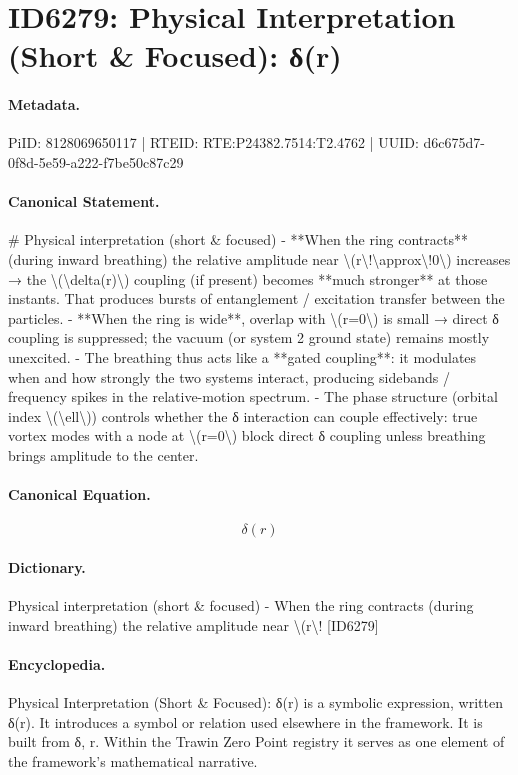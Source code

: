 \section*{ID6279: Physical Interpretation (Short \& Focused): δ(r)}
\paragraph{Metadata.}
PiID: 8128069650117 | RTEID: RTE:P24382.7514:T2.4762 | UUID: d6c675d7-0f8d-5e59-a222-f7be50c87c29

\paragraph{Canonical Statement.}
\# Physical interpretation (short \& focused) - **When the ring contracts** (during inward breathing) the relative amplitude near \textbackslash{}(r\textbackslash{}!\textbackslash{}approx\textbackslash{}!0\textbackslash{}) increases → the \textbackslash{}(\textbackslash{}delta(r)\textbackslash{}) coupling (if present) becomes **much stronger** at those instants. That produces bursts of entanglement / excitation transfer between the particles. - **When the ring is wide**, overlap with \textbackslash{}(r=0\textbackslash{}) is small → direct δ coupling is suppressed; the vacuum (or system 2 ground state) remains mostly unexcited. - The breathing thus acts like a **gated coupling**: it modulates when and how strongly the two systems interact, producing sidebands / frequency spikes in the relative-motion spectrum. - The phase structure (orbital index \textbackslash{}(\textbackslash{}ell\textbackslash{})) controls whether the δ interaction can couple effectively: true vortex modes with a node at \textbackslash{}(r=0\textbackslash{}) block direct δ coupling unless breathing brings amplitude to the center.

\paragraph{Canonical Equation.}
\[
\delta(r)
\]

\paragraph{Dictionary.}
Physical interpretation (short \& focused) - When the ring contracts (during inward breathing) the relative amplitude near \textbackslash{}(r\textbackslash{}! [ID6279]

\paragraph{Encyclopedia.}
Physical Interpretation (Short \& Focused): δ(r) is a symbolic expression, written δ(r). It introduces a symbol or relation used elsewhere in the framework. It is built from δ, r. Within the Trawin Zero Point registry it serves as one element of the framework's mathematical narrative.
